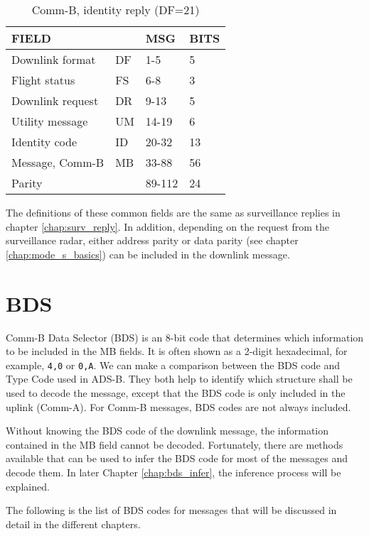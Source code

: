 \begin{table}[ht]
  \centering
  \caption{Comm-B, identity reply (DF=21)}
  \label{tb:df_21_structure}
  \begin{tabular}[t]{|l|l|l|l|}
  \hline
  \textbf{FIELD} & \textbf{} & \textbf{MSG} & \textbf{BITS} \\ \hline
  Downlink format         & DF & 1-5    & 5   \\ \hline
  Flight status           & FS & 6-8    & 3   \\ \hline
  Downlink request        & DR & 9-13   & 5   \\ \hline
  Utility message         & UM & 14-19  & 6   \\ \hline
  Identity code           & ID & 20-32  & 13  \\ \hline
  Message, Comm-B         & MB & 33-88  & 56  \\ \hline
  Parity  &  & 89-112  & 24  \\ \hline
  \end{tabular}
\end{table}

The definitions of these common fields are the same as surveillance replies in chapter \ref{chap:surv_reply}. In addition, depending on the request from the surveillance radar, either address parity or data parity (see chapter \ref{chap:mode_s_basics}) can be included in the downlink message.


\section{BDS}

Comm-B Data Selector (BDS) is an 8-bit code that determines which information to be included in the MB fields. It is often shown as a 2-digit hexadecimal, for example, \texttt{4,0} or \texttt{0,A}. We can make a comparison between the BDS code and Type Code used in ADS-B. They both help to identify which structure shall be used to decode the message, except that the BDS code is only included in the uplink (Comm-A). For Comm-B messages, BDS codes are not always included.

Without knowing the BDS code of the downlink message, the information contained in the MB field cannot be decoded. Fortunately, there are methods available that can be used to infer the BDS code for most of the messages and decode them. In later Chapter \ref{chap:bds_infer}, the inference process will be explained.

The following is the list of BDS codes for messages that will be discussed in detail in the different chapters.

